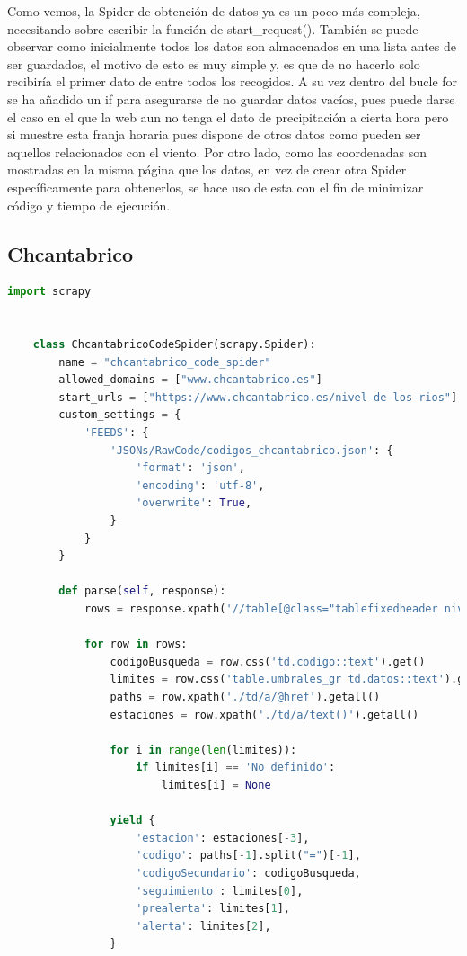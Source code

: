 Como vemos, la Spider de obtención de datos ya es un poco más compleja, necesitando sobre-escribir la función de start\_request(). También se puede observar como inicialmente todos los datos son almacenados en una lista antes de ser guardados, el motivo de esto es muy simple y, es que de no hacerlo solo recibiría el primer dato de entre todos los recogidos.\newline
\newline
A su vez dentro del bucle for se ha añadido un if para asegurarse de no guardar datos vacíos, pues puede darse el caso en el que la web aun no tenga el dato de precipitación a cierta hora pero si muestre esta franja horaria pues dispone de otros datos como pueden ser aquellos relacionados con el viento.\newline
\newline
Por otro lado, como las coordenadas son mostradas en la misma página que los datos, en vez de crear otra Spider específicamente para obtenerlos, se hace uso de esta con el fin de minimizar código y tiempo de ejecución.

\subsection{Chcantabrico}

\begin{lstlisting}[language=Python, caption={Chcantabrico Code Spider}]
	import scrapy
	
	
	class ChcantabricoCodeSpider(scrapy.Spider):
		name = "chcantabrico_code_spider"
		allowed_domains = ["www.chcantabrico.es"]
		start_urls = ["https://www.chcantabrico.es/nivel-de-los-rios"]
		custom_settings = {
			'FEEDS': {
				'JSONs/RawCode/codigos_chcantabrico.json': {
					'format': 'json',
					'encoding': 'utf-8',
					'overwrite': True,
				}
			}
		}
	
		def parse(self, response):
			rows = response.xpath('//table[@class="tablefixedheader niveles"]/tbody/tr')
			
			for row in rows:
				codigoBusqueda = row.css('td.codigo::text').get()
				limites = row.css('table.umbrales_gr td.datos::text').getall()
				paths = row.xpath('./td/a/@href').getall()
				estaciones = row.xpath('./td/a/text()').getall()
			
				for i in range(len(limites)):
					if limites[i] == 'No definido':
						limites[i] = None
				
				yield {
					'estacion': estaciones[-3],
					'codigo': paths[-1].split("=")[-1],
					'codigoSecundario': codigoBusqueda,
					'seguimiento': limites[0],
					'prealerta': limites[1],
					'alerta': limites[2],
				}
\end{lstlisting}

